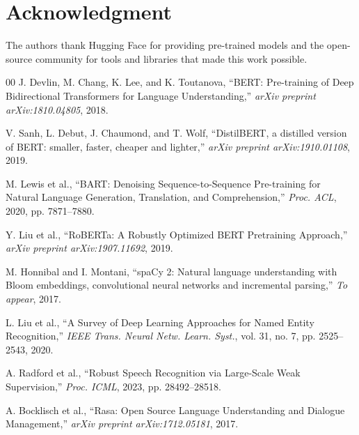 \documentclass[conference]{IEEEtran}
\begin{document}
\section*{Acknowledgment}

The authors thank Hugging Face for providing pre-trained models and the open-source community for tools and libraries that made this work possible.

\begin{thebibliography}{00}
 J. Devlin, M. Chang, K. Lee, and K. Toutanova, ``BERT: Pre-training of Deep Bidirectional Transformers for Language Understanding,'' \textit{arXiv preprint arXiv:1810.04805}, 2018.

 V. Sanh, L. Debut, J. Chaumond, and T. Wolf, ``DistilBERT, a distilled version of BERT: smaller, faster, cheaper and lighter,'' \textit{arXiv preprint arXiv:1910.01108}, 2019.

 M. Lewis et al., ``BART: Denoising Sequence-to-Sequence Pre-training for Natural Language Generation, Translation, and Comprehension,'' \textit{Proc. ACL}, 2020, pp. 7871--7880.

 Y. Liu et al., ``RoBERTa: A Robustly Optimized BERT Pretraining Approach,'' \textit{arXiv preprint arXiv:1907.11692}, 2019.

 M. Honnibal and I. Montani, ``spaCy 2: Natural language understanding with Bloom embeddings, convolutional neural networks and incremental parsing,'' \textit{To appear}, 2017.

 L. Liu et al., ``A Survey of Deep Learning Approaches for Named Entity Recognition,'' \textit{IEEE Trans. Neural Netw. Learn. Syst.}, vol. 31, no. 7, pp. 2525--2543, 2020.

 A. Radford et al., ``Robust Speech Recognition via Large-Scale Weak Supervision,'' \textit{Proc. ICML}, 2023, pp. 28492--28518.

 A. Bocklisch et al., ``Rasa: Open Source Language Understanding and Dialogue Management,'' \textit{arXiv preprint arXiv:1712.05181}, 2017.

\end{thebibliography}
\end{document}
